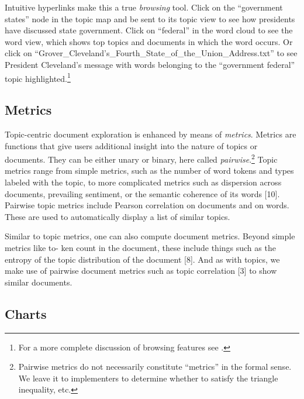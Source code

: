 \documentclass[11pt]{article}
\begin{document}
Intuitive hyperlinks make this a true \textit{browsing} tool. Click on the
``government states'' node in the topic map and be sent to its topic view to see
how presidents have discussed state government. Click on ``federal'' in the word
cloud to see the word view, which shows top topics and documents in which the
word occurs. Or click on ``Grover\_\allowbreak{}Cleveland's\_\allowbreak{}Fourth\_\allowbreak{}State\_\allowbreak{}of\_\allowbreak{}the\_\allowbreak{}Union\_\allowbreak{}Address.txt''
to see President Cleveland's message with words belonging to the ``government federal''
topic highlighted.\footnote{For a more complete discussion
of browsing features see \cite{gardner_browser_2010}.}%

\subsection{Metrics}
Topic-centric document exploration is enhanced by means of \textit{metrics}.
Metrics are functions that give users additional insight into the nature of
topics or documents. They can be either unary or binary,
here called \textit{pairwise}.\footnote{Pairwise metrics do not necessarily
constitute ``metrics'' in the formal sense. We leave it to implementers to
determine whether to satisfy the triangle inequality, etc.} Topic metrics range
from simple metrics, such as the number of word tokens and types labeled with
the topic, to more complicated metrics such as dispersion across
documents, prevailing sentiment, or the semantic coherence of its words [10]. Pairwise topic metrics%
include Pearson correlation on documents and on words. These are used to automatically
display a list of similar topics.

Similar to topic metrics, one can also compute document metrics. Beyond simple metrics like to-
ken count in the document, these include things such as the entropy of the topic distribution of
the document [8]. And as with topics, we make use of pairwise document metrics such as topic%
correlation [3] to show similar documents.%

\subsection{Charts}
\end{document}
